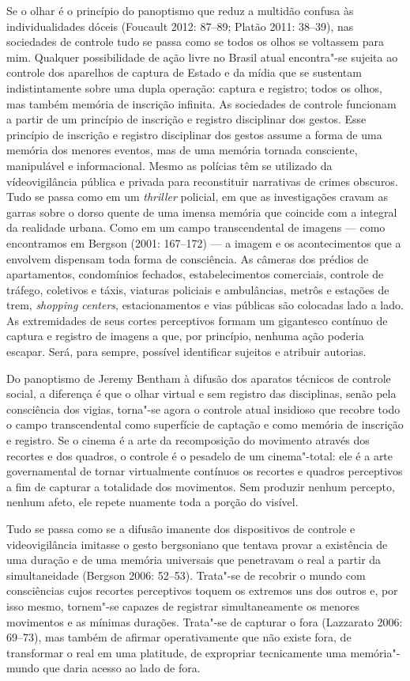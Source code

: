 Se o olhar é o princípio do panoptismo que reduz a multidão confusa às
individualidades dóceis (Foucault 2012: 87--89; Platão 2011: 38--39),
nas sociedades de controle tudo se passa como se todos os olhos se
voltassem para mim. Qualquer possibilidade de ação livre no Brasil atual
encontra"-se sujeita ao controle dos aparelhos de captura de Estado e da
mídia que se sustentam indistintamente sobre uma dupla operação: captura
e registro; todos os olhos, mas também memória de inscrição infinita. As
sociedades de controle funcionam a partir de um princípio de inscrição e
registro disciplinar dos gestos. Esse princípio de inscrição e registro
disciplinar dos gestos assume a forma de uma memória dos menores
eventos, mas de uma memória tornada consciente, manipulável e
informacional. Mesmo as polícias têm se utilizado da vídeovigilância
pública e privada para reconstituir narrativas de crimes obscuros. Tudo
se passa como em um \emph{thriller }policial, em que as investigações
cravam as garras sobre o dorso quente de uma imensa memória que coincide
com a integral da realidade urbana. Como em um campo transcendental de
imagens --- como encontramos em Bergson (2001: 167--172) --- a imagem e os
acontecimentos que a envolvem dispensam toda forma de consciência. As
câmeras dos prédios de apartamentos, condomínios fechados,
estabelecimentos comerciais, controle de tráfego, coletivos e táxis,
viaturas policiais e ambulâncias, metrôs e estações de trem,
\emph{shopping centers}, estacionamentos e vias públicas são colocadas
lado a lado. As extremidades de seus cortes perceptivos formam um
gigantesco contínuo de captura e registro de imagens a que, por
princípio, nenhuma ação poderia escapar. Será, para sempre, possível
identificar sujeitos e atribuir autorias.

Do panoptismo de Jeremy Bentham à difusão dos aparatos técnicos de
controle social, a diferença é que o olhar virtual e sem registro das
disciplinas, senão pela consciência dos vigias, torna"-se agora o
controle atual insidioso que recobre todo o campo transcendental como
superfície de captação e como memória de inscrição e registro. Se o
cinema é a arte da recomposição do movimento através dos recortes e dos
quadros, o controle é o pesadelo de um cinema"-total: ele é a arte
governamental de tornar virtualmente contínuos os recortes e quadros
perceptivos a fim de capturar a totalidade dos movimentos. Sem produzir
nenhum percepto, nenhum afeto, ele repete nuamente toda a porção do
visível.

Tudo se passa como se a difusão imanente dos dispositivos de controle e
videovigilância imitasse o gesto bergsoniano que tentava provar a
existência de uma duração e de uma memória universais que penetravam o
real a partir da simultaneidade (Bergson 2006: 52--53). Trata"-se de
recobrir o mundo com consciências cujos recortes perceptivos toquem os
extremos uns dos outros e, por isso mesmo, tornem"-se capazes de
registrar simultaneamente os menores movimentos e as mínimas durações.
Trata"-se de capturar o fora (Lazzarato 2006: 69--73), mas também de
afirmar operativamente que não existe fora, de transformar o real em uma
platitude, de expropriar tecnicamente uma memória"-mundo que daria acesso
ao lado de fora.


